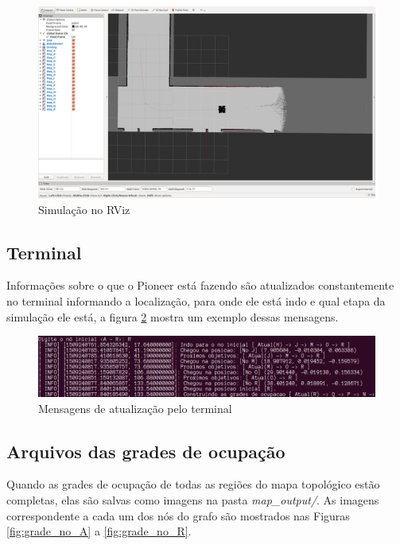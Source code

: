 \documentclass{llncs}
\begin{document}
\begin{figure}
	\centerline{\includegraphics[scale=0.27]{rviz}}
	\caption{Simulação no RViz}
	\label{fig:rviz}
\end{figure}


\subsection{Terminal}
Informações sobre o que o Pioneer está fazendo são atualizados constantemente no terminal informando a localização, para onde ele está indo e qual etapa da simulação ele está, a figura \ref{fig:terminal} mostra um exemplo dessas mensagens.

\begin{figure}
	\centerline{\includegraphics[scale=0.5]{terminal}}
	\caption{Mensagens de atualização pelo terminal}
	\label{fig:terminal}
\end{figure}


\pagebreak
\subsection{Arquivos das grades de ocupação} \label{grid_file}
Quando as grades de ocupação de todas as regiões do mapa topológico estão completas, elas são salvas como imagens na pasta \textit{map\_output/}. As imagens correspondente a cada um dos nós do grafo são mostrados nas Figuras \ref{fig:grade_no_A} a \ref{fig:grade_no_R}.
\end{document}
